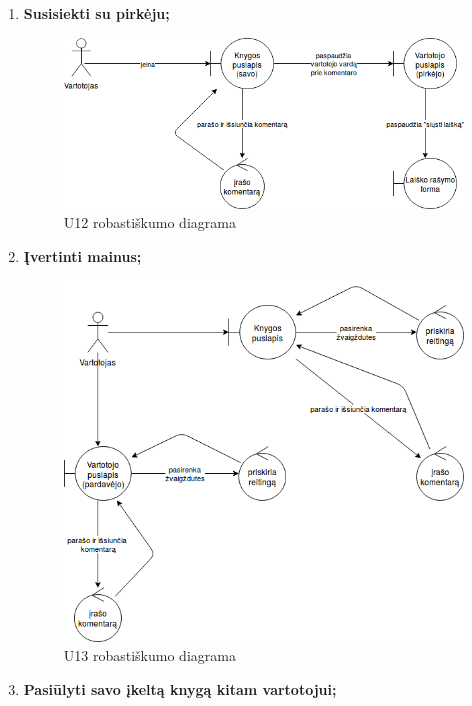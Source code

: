 \documentclass{VUMIFPSkursinis}
\begin{document}
\begin{enumerate}[label=\textbf{U\arabic*.}]
\begin{figure}[H]
					\label{img:psi2-u11-robustness}
				\end{figure}
			\item \textbf{Susisiekti su pirkėju;}
				\begin{figure}[H]
					\centering
					\includegraphics[scale=0.6]{img/U12.png}
					\caption{U12 robastiškumo diagrama}
					\label{img:psi2-u12-robustness}
				\end{figure}
			\item \textbf{Įvertinti mainus;}
				\begin{figure}[H]
					\centering
					\includegraphics[scale=0.6]{img/U13.png}
					\caption{U13 robastiškumo diagrama}
					\label{img:psi2-u13-robustness}
				\end{figure}
			\item \textbf{Pasiūlyti savo įkeltą knygą kitam vartotojui;}
				\begin{figure}[H]

\end{figure}
\end{enumerate}
\end{document}
